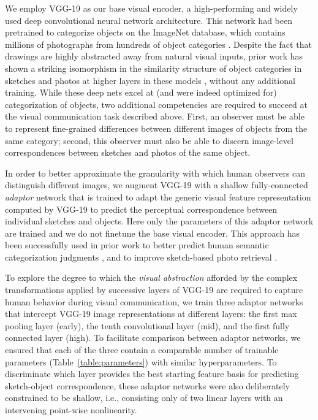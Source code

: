 \documentclass[9pt,twocolumn,twoside]{pnas-new}
\begin{document}
{We employ VGG-19 \cite{simonyan2014very} as our base visual encoder, a high-performing and widely used deep convolutional neural network architecture. This network had been pretrained to categorize objects on the ImageNet database, which contains millions of photographs from hundreds of object categories \cite{deng2009imagenet}. Despite the fact that drawings are highly abstracted away from natural visual inputs, prior work has shown a striking isomorphism in the similarity structure \cite{kriegeskorte2008matching} of object categories in sketches and photos at higher layers in these models \cite{FanCommon2018}, without any additional training. While these deep nets excel at (and were indeed optimized for) categorization of objects, two additional competencies are required to succeed at the visual communication task described above. First, an observer must be able to represent fine-grained differences between different images of objects from the same category; second, this observer must also be able to discern image-level correspondences between sketches and photos of the same object. 

In order to better approximate the granularity with which human observers can distinguish different images, we augment VGG-19 with a shallow fully-connected \textit{adaptor} network that is trained to adapt the generic visual feature representation computed by VGG-19 to predict the perceptual correspondence between individual sketches and objects. Here only the parameters of this adaptor network are trained and we do not finetune the base visual encoder. This approach has been successfully used in prior work to better predict human semantic categorization judgments \cite[]{peterson2016adapting}, and to improve sketch-based photo retrieval \cite[]{sangkloy2016sketchy}.

To explore the degree to which the \textit{visual abstraction} afforded by the complex transformations applied by successive layers of VGG-19 are required to capture human behavior during visual communication, we train three adaptor networks that intercept VGG-19 image representations at different layers: the first max pooling layer (early), the tenth convolutional layer (mid), and the first fully connected layer (high). To facilitate comparison between adaptor networks, we ensured that each of the three contain a comparable number of trainable parameters (Table~\ref{table:parameters}) with similar hyperparameters. To discriminate which layer provides the best starting feature basis for predicting sketch-object correspondence, these adaptor networks were also deliberately constrained to be shallow, i.e., consisting only of two linear layers with an intervening point-wise nonlinearity. 

}
\end{document}
